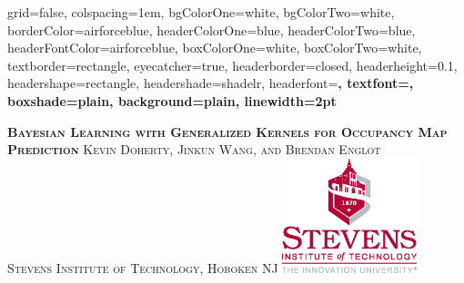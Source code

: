 \documentclass[portrait,final,archD,fontscale=0.477]{baposter}
\begin{document}


\begin{poster}%
  {
  grid=false,
  colspacing=1em,
  bgColorOne=white,
  bgColorTwo=white,
  borderColor=airforceblue,
  headerColorOne=blue,
  headerColorTwo=blue,
  headerFontColor=airforceblue,
  boxColorOne=white,
  boxColorTwo=white,
  textborder=rectangle,
  eyecatcher=true,
  headerborder=closed,
  headerheight=0.1\textheight,
  headershape=rectangle,
  headershade=shadelr,
  headerfont=\Large\bf\textsc, %
  textfont={\setlength{\parindent}{1.5em}},
  boxshade=plain,
  background=plain,
  linewidth=2pt
  }
  {\begin{minipage}{8em}
   \hfill\vspace{1in}
  \end{minipage} } %
  {\bf \textsc{  Bayesian Learning with Generalized Kernels for Occupancy Map Prediction} }
  {\textsc{  Kevin Doherty, Jinkun Wang, and Brendan Englot \\ Stevens Institute of Technology, Hoboken NJ}}
  {%
    \includegraphics[height=9.0em]{img/stevenslogo}
  }


\end{poster}
\end{document}
